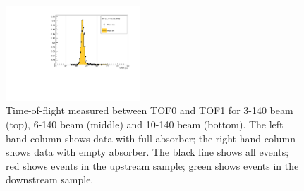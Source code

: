 \begin{figure}[!tbh]
    \includegraphics*[width=0.45\textwidth]{02-Cuts/Figures/2017-2.7_10-140_lH2_empty/tof_tof01_us_cut.pdf}
    \caption{Time-of-flight measured between TOF0 and TOF1 for 3-140 beam (top), 6-140 beam (middle) and 10-140 beam (bottom).
    The left hand column shows data with full absorber; the right hand column shows data with empty absorber.
    The black line shows all events; red shows events in the upstream sample; green shows events in the downstream sample.
\label{fig:tof01}}
\end{figure}

